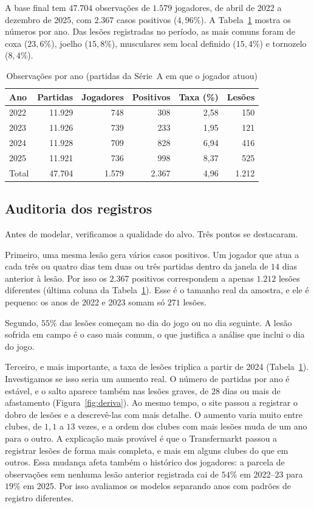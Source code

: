 \documentclass[conference]{IEEEtran}
\begin{document}
A base final tem $47{.}704$ observações de $1{.}579$ jogadores, de abril de 2022 a dezembro de 2025, com $2{.}367$ casos positivos ($4{,}96\%$). A Tabela~\ref{tab:base} mostra os números por ano. Das lesões registradas no período, as mais comuns foram de coxa ($23{,}6\%$), joelho ($15{,}8\%$), musculares sem local definido ($15{,}4\%$) e tornozelo ($8{,}4\%$).

\begin{table}[!t]
\caption{Observações por ano (partidas da Série~A em que o jogador atuou)}
\label{tab:base}
\centering
\begin{tabular}{lrrrrr}
\toprule
Ano & Partidas & Jogadores & Positivos & Taxa (\%) & Lesões \\
\midrule
2022 & 11{.}929 & 748 & 308 & 2{,}58 & 150 \\
2023 & 11{.}926 & 739 & 233 & 1{,}95 & 121 \\
2024 & 11{.}928 & 709 & 828 & 6{,}94 & 416 \\
2025 & 11{.}921 & 736 & 998 & 8{,}37 & 525 \\
\midrule
Total & 47{.}704 & 1{.}579 & 2{.}367 & 4{,}96 & 1{.}212 \\
\bottomrule
\end{tabular}
\end{table}

\subsection{Auditoria dos registros}
\label{sec:auditoria}

Antes de modelar, verificamos a qualidade do alvo. Três pontos se destacaram.

Primeiro, uma mesma lesão gera vários casos positivos. Um jogador que atua a cada três ou quatro dias tem duas ou três partidas dentro da janela de $14$ dias anterior à lesão. Por isso os $2{.}367$ positivos correspondem a apenas $1{.}212$ lesões diferentes (última coluna da Tabela~\ref{tab:base}). Esse é o tamanho real da amostra, e ele é pequeno: os anos de 2022 e 2023 somam só $271$ lesões.

Segundo, $55\%$ das lesões começam no dia do jogo ou no dia seguinte. A lesão sofrida em campo é o caso mais comum, o que justifica a análise que inclui o dia do jogo.

Terceiro, e mais importante, a taxa de lesões triplica a partir de 2024 (Tabela~\ref{tab:base}). Investigamos se isso seria um aumento real. O número de partidas por ano é estável, e o salto aparece também nas lesões graves, de $28$ dias ou mais de afastamento (Figura~\ref{fig:deriva}). Ao mesmo tempo, o site passou a registrar o dobro de lesões e a descrevê-las com mais detalhe. O aumento varia muito entre clubes, de $1{,}1$ a $13$ vezes, e a ordem dos clubes com mais lesões muda de um ano para o outro. A explicação mais provável é que o Transfermarkt passou a registrar lesões de forma mais completa, e mais em alguns clubes do que em outros. Essa mudança afeta também o histórico dos jogadores: a parcela de observações sem nenhuma lesão anterior registrada cai de $54\%$ em 2022--23 para $19\%$ em 2025. Por isso avaliamos os modelos separando anos com padrões de registro diferentes.
\end{document}
